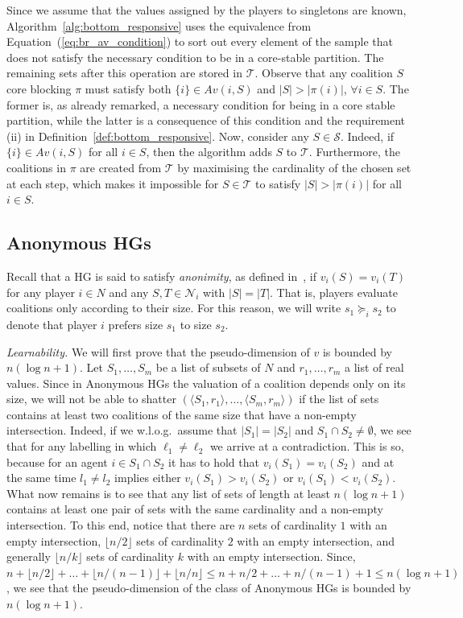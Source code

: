 \documentclass[letterpaper]{article} %
\makeatletter
\newcommand{\set}[1]{\{#1\}}
\newcommand{\modulus}[1]{\vert #1 \vert}
\newcommand{\proofpart}[1]{%
  \par
  \addvspace{\smallskipamount}%
  \noindent\emph{#1} \hspace{2pt}
}
\makeatother
\begin{document}
Since we assume that the values assigned by the players to singletons are known, Algorithm~\ref{alg:bottom_responsive} uses the equivalence from Equation~(\ref{eq:br_av_condition}) to sort out every element of the sample that does not satisfy the necessary condition to be in a core-stable partition. The remaining sets after this operation are stored in $\mathcal{T}$.
%
Observe that any coalition $S$ core blocking $\pi$ must satisfy both $\set{i}\in Av(i, S)$ and $\modulus{S}> \modulus{\pi(i)}$, $\forall i\in S$. The former is, as already remarked, a necessary condition for being in a core stable partition, while the latter is a consequence of this condition and the requirement (ii) in Definition~\ref{def:bottom_responsive}.
Now, consider any $S \in \mathcal{S}$.
Indeed, if $\set{i}\in Av(i, S)$  for all $i \in S$, then the algorithm adds $S$ to $\mathcal{T}$. Furthermore, the coalitions in $\pi$ are created from $\mathcal{T}$ by maximising the cardinality of the chosen set at each step, which makes it impossible for $S \in \mathcal{T}$ to satisfy $\modulus{S}> \modulus{\pi(i)}$ for all $i\in S$.

\subsection{Anonymous HGs}
Recall that a HG is said to satisfy \emph{anonimity}, as defined in~\cite{Banerjee01, Bogomolnaia02}, if $v_i(S) = v_i(T)$ for any player $i \in N$ and any $S,T\in \mathcal{N}_i$ with $|S|=|T|$. That is, players evaluate coalitions only according to their size. For this reason, we will write $s_1 \succeq_i s_2$ to denote that player $i$ prefers size $s_1$ to size $s_2$.
%
\proofpart{Learnability.} We will first prove that the pseudo-dimension of $v$ is bounded by $n(\log n+1)$.
Let $S_1,\dots,S_m$ be a list of subsets of $N$ and $r_1,\dots, r_m$ a list of real values. Since in Anonymous HGs the valuation of a coalition depends only on its size, we will not be able to shatter $(\langle S_1,r_1\rangle,\dots,\langle S_m,r_m\rangle)$ if the list of sets contains at least two coalitions of the same size that have a non-empty intersection. Indeed, if we w.l.o.g.\ assume that $|S_1|=|S_2|$ and $S_1\cap S_2\neq\emptyset$, we see that for any labelling in which $\ell_1\neq\ell_2$ we arrive at a contradiction. This is so, because for an agent $i\in S_1\cap S_2$ it has to hold that $v_i(S_1)=v_i(S_2)$ and at the same time $l_1\neq l_2$ implies either $v_i(S_1)>v_i(S_2)$ or $v_i(S_1)<v_i(S_2)$.
What now remains is to see that any list of sets of length at least $n(\log n +1)$ contains at least one pair of sets with the same cardinality and a non-empty intersection.
To this end, notice that there are $n$ sets of cardinality $1$ with an empty intersection, $\lfloor n/2\rfloor$ sets of cardinality $2$ with an empty intersection, and generally $\lfloor n/k\rfloor$ sets of cardinality $k$ with an empty intersection. Since, $n+\lfloor n/2\rfloor +\dots + \lfloor n/(n-1)\rfloor + \lfloor n/n\rfloor \le n + n/2 + \dots + n/(n-1) + 1 \le n(\log n +1)$, we see that the pseudo-dimension of the class of Anonymous HGs is bounded by $n(\log n+1)$.
\end{document}

